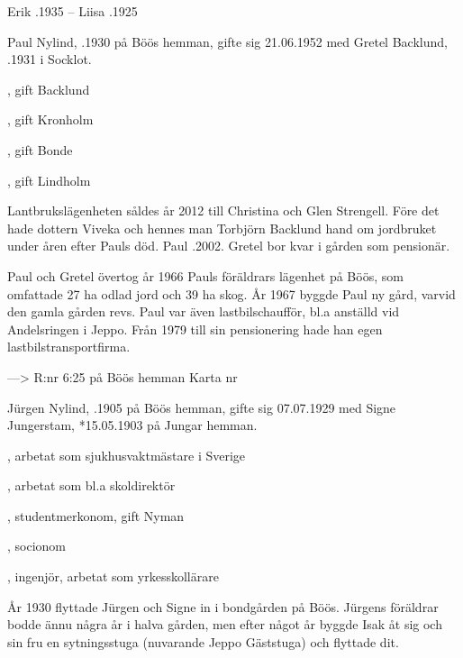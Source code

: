 Erik .1935  --  Liisa .1925





Paul Nylind, .1930 på Böös hemman, gifte sig 21.06.1952 med Gretel Backlund, .1931 i Socklot.
\begin{jhchildren}
  \item {}, gift Backlund
  \item {}, gift Kronholm
  \item {}, gift Bonde
  \item {}, gift Lindholm
\end{jhchildren}
Lantbrukslägenheten såldes år 2012 till Christina och Glen Strengell. Före det hade dottern Viveka och hennes man Torbjörn Backlund hand om jordbruket under åren efter Pauls död. Paul .2002. Gretel bor kvar i gården som pensionär.


Paul och Gretel övertog år 1966 Pauls föräldrars lägenhet på Böös, som omfattade 27 ha odlad jord och 39 ha skog. År 1967 byggde Paul ny gård, varvid den gamla gården revs. Paul var även lastbilschaufför, bl.a anställd vid Andelsringen i Jeppo. Från 1979 till sin pensionering hade han egen lastbilstransportfirma.


--->    R:nr 6:25		på	Böös hemman   Karta    nr 

Jürgen Nylind, .1905 på Böös hemman, gifte sig 07.07.1929 med Signe Jungerstam, *15.05.1903 på Jungar hemman.
\begin{jhchildren}
  \item {}
  \item {}, arbetat som sjukhusvaktmästare i Sverige
  \item {}, arbetat som bl.a skoldirektör
  \item {}, studentmerkonom, gift Nyman
  \item {}, socionom
  \item {}, ingenjör, arbetat som yrkesskollärare
\end{jhchildren}
År 1930 flyttade Jürgen och Signe in i bondgården på Böös. Jürgens föräldrar bodde ännu några år i halva gården, men efter något år byggde Isak åt sig och sin fru en sytningsstuga (nuvarande Jeppo Gäststuga) och flyttade dit.

